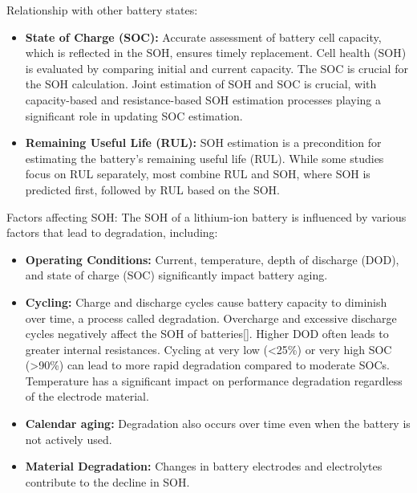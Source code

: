 Relationship with other battery states:
\begin{itemize}
    \item \textbf{State of Charge (SOC):} Accurate assessment of battery cell capacity, which is reflected in the SOH, ensures timely replacement. Cell health (SOH) is evaluated by comparing initial and current capacity. The SOC is crucial for the SOH calculation\cite{energies-13-01811-v2}. Joint estimation of SOH and SOC is crucial, with capacity-based and resistance-based SOH estimation processes playing a significant role in updating SOC estimation\cite{energies-13-01811-v2}.
    \item \textbf{Remaining Useful Life (RUL):} SOH estimation is a precondition for estimating the battery's remaining useful life (RUL)\cite{wevj-12-00120-v2}. While some studies focus on RUL separately, most combine RUL and SOH, where SOH is predicted first, followed by RUL based on the SOH\cite{batteries-10-00181-v2}.
\end{itemize}

Factors affecting SOH:
The SOH of a lithium-ion battery is influenced by various factors that lead to degradation, including:
\begin{itemize}
    \item \textbf{Operating Conditions:} Current, temperature, depth of discharge (DOD), and state of charge (SOC) significantly impact battery aging\cite{energies-18-00342-v2}.
    \item \textbf{Cycling:} Charge and discharge cycles cause battery capacity to diminish over time, a process called degradation\cite{electronics-13-01675}\cite{batteries-10-00181-v2}. Overcharge and excessive discharge cycles negatively affect the SOH of batteries[]. Higher DOD often leads to greater internal resistances\cite{energies-18-00342-v2}. Cycling at very low (<25\%) or very high SOC (>90\%) can lead to more rapid degradation compared to moderate SOCs\cite{energies-18-00342-v2}. Temperature has a significant impact on performance degradation regardless of the electrode material\cite{energies-18-00342-v2}.
    \item \textbf{Calendar aging:} Degradation also occurs over time even when the battery is not actively used\cite{energies-18-00342-v2}.
    \item \textbf{Material Degradation:} Changes in battery electrodes and electrolytes contribute to the decline in SOH\cite{energies-18-00342-v2}.
\end{itemize}

